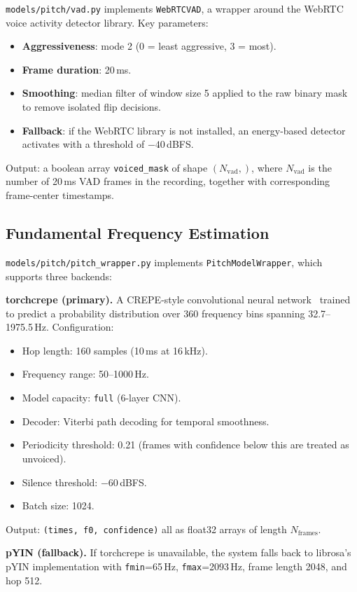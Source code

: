 \documentclass[11pt,letterpaper]{article}
\begin{document}
\texttt{models/pitch/vad.py} implements \texttt{WebRTCVAD}, a wrapper around
the WebRTC voice activity detector library.
Key parameters:
\begin{itemize}[noitemsep]
  \item \textbf{Aggressiveness}: mode 2 (0 = least aggressive, 3 = most).
  \item \textbf{Frame duration}: 20\,ms.
  \item \textbf{Smoothing}: median filter of window size 5 applied to the raw
        binary mask to remove isolated flip decisions.
  \item \textbf{Fallback}: if the WebRTC library is not installed, an
        energy-based detector activates with a threshold of $-40$\,dBFS.
\end{itemize}
Output: a boolean array \texttt{voiced\_mask} of shape $(N_\text{vad},)$,
where $N_\text{vad}$ is the number of 20\,ms VAD frames in the recording,
together with corresponding frame-center timestamps.

\subsection{Fundamental Frequency Estimation}

\texttt{models/pitch/pitch\_wrapper.py} implements \texttt{PitchModelWrapper},
which supports three backends:

\textbf{torchcrepe (primary).}
A CREPE-style convolutional neural network~\cite{kim2018crepe} trained to
predict a probability distribution over 360 frequency bins spanning
32.7--1975.5\,Hz.
Configuration:
\begin{itemize}[noitemsep]
  \item Hop length: 160 samples (10\,ms at 16\,kHz).
  \item Frequency range: 50--1000\,Hz.
  \item Model capacity: \texttt{full} (6-layer CNN).
  \item Decoder: Viterbi path decoding for temporal smoothness.
  \item Periodicity threshold: 0.21 (frames with confidence below this are
        treated as unvoiced).
  \item Silence threshold: $-60$\,dBFS.
  \item Batch size: 1024.
\end{itemize}
Output: \texttt{(times, f0, confidence)} all as float32 arrays of length
$N_\text{frames}$.

\textbf{pYIN (fallback).}
If torchcrepe is unavailable, the system falls back to librosa's pYIN
implementation with \texttt{fmin}=65\,Hz, \texttt{fmax}=2093\,Hz, frame
length 2048, and hop 512.
\end{document}
